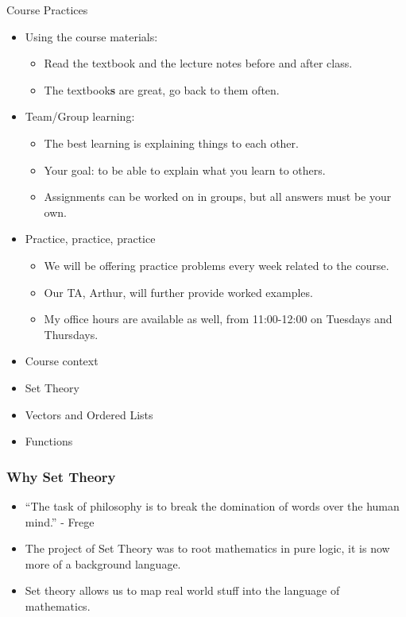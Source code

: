 \documentclass[aspectratio=169, handout]{beamer}
\numberwithin{equation}{section}
\begin{document}
\begin{frame}{Course Practices}

\begin{itemize}
\item Using the course materials:
\begin{itemize}
\item Read the textbook and the lecture notes before and after class.
\item The textbook\textbf{s} are great, go back to them often.
\end{itemize}\pause
\item Team/Group learning:
\begin{itemize}
\item The best learning is explaining things to each other.
\item Your goal: to be able to explain what you learn to others.
\item Assignments can be worked on in groups, but all answers must be your own.
\end{itemize}
\item Practice, practice, practice
\begin{itemize}
\item We will be offering practice problems every week related to the course.
\item Our TA, Arthur, will further provide worked examples.
\item My office hours are available as well, from 11:00-12:00 on Tuesdays and Thursdays.
\end{itemize}
\end{itemize}

\end{frame}





\begin{frame}

\begin{itemize}
\item \textcolor{mygray}{Course context}
\item \textcolor{myblack}{Set Theory}
\item \textcolor{mygray}{Vectors and Ordered Lists}
\item \textcolor{mygray}{Functions}
\end{itemize}

\end{frame}


\begin{frame}
\frametitle{Why Set Theory}
\begin{itemize}
\item ``The task of philosophy is to break the domination of words over the human mind.'' - Frege
\item The project of Set Theory was to root mathematics in pure logic, it is now more of a background language.
\item Set theory allows us to map real world stuff into the language of mathematics.
\end{itemize}
\end{frame}
\end{document}
